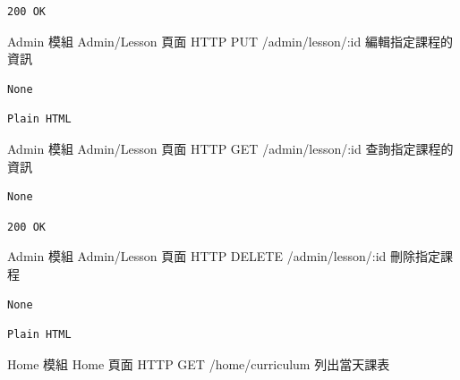 \documentclass{article}
\begin{document}
\begin{lrbox}{\jsonoutputbox}
	\begin{lstlisting}
200 OK
\end{lstlisting}
\end{lrbox}

{Admin 模組}
{Admin/Lesson 頁面}
{HTTP PUT}
{/admin/lesson/:id}
{編輯指定課程的資訊}

\bigskip

\begin{lrbox}{\jsoninputbox}
	\begin{lstlisting}
None
\end{lstlisting}
\end{lrbox}

\begin{lrbox}{\jsonoutputbox}
	\begin{lstlisting}
Plain HTML
\end{lstlisting}
\end{lrbox}

{Admin 模組}
{Admin/Lesson 頁面}
{HTTP GET}
{/admin/lesson/:id}
{查詢指定課程的資訊}

\bigskip

\begin{lrbox}{\jsoninputbox}
	\begin{lstlisting}
None
\end{lstlisting}
\end{lrbox}

\begin{lrbox}{\jsonoutputbox}
	\begin{lstlisting}
200 OK
\end{lstlisting}
\end{lrbox}

{Admin 模組}
{Admin/Lesson 頁面}
{HTTP DELETE}
{/admin/lesson/:id}
{刪除指定課程}

\bigskip

\begin{lrbox}{\jsoninputbox}
	\begin{lstlisting}
None
\end{lstlisting}
\end{lrbox}

\begin{lrbox}{\jsonoutputbox}
	\begin{lstlisting}
Plain HTML
\end{lstlisting}
\end{lrbox}

{Home 模組}
{Home 頁面}
{HTTP GET}
{/home/curriculum}
{列出當天課表}
\end{document}
